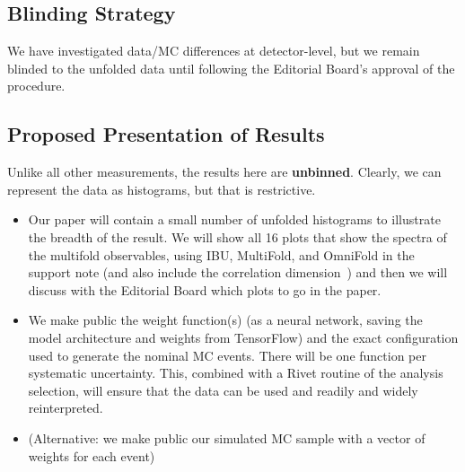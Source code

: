 \subsection{Blinding Strategy}

We have investigated data/MC differences at detector-level, but we remain blinded to the unfolded data until following the Editorial Board's approval of the procedure.

\subsection{Proposed Presentation of Results}

Unlike all other measurements, the results here are \textbf{unbinned}.  Clearly, we can represent the data as histograms, but that is restrictive.  

\begin{itemize}
        \item Our paper will contain a small number of unfolded histograms to illustrate the breadth of the result.  We will show all 16 plots that show the spectra of the multifold observables, using IBU, MultiFold, and OmniFold in the support note (and also include the correlation dimension~\cite{Komiske:2019fks}) and then we will discuss with the Editorial Board which plots to go in the paper.
        \item We make public the weight function(s) (as a neural network, saving the model architecture and weights from TensorFlow) and the exact configuration used to generate the nominal MC events.  There will be one function per systematic uncertainty.  This, combined with a Rivet routine of the analysis selection, will ensure that the data can be used and readily and widely reinterpreted.
        \item (Alternative: we make public our simulated MC sample with a vector of weights for each event)
\end{itemize}

